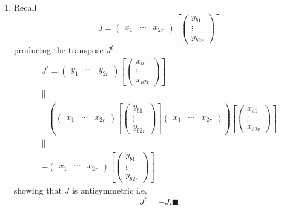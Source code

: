 \documentclass[aps,preprint]{revtex4}
\begin{document}
\begin{enumerate}
\item Recall 
\begin{equation}
J=\left( 
\begin{array}{ccc}
x_{1} & \cdots & x_{2r}%
\end{array}%
\right) \left[ \left( 
\begin{array}{c}
y_{b1} \\ 
\vdots \\ 
y_{b2r}%
\end{array}%
\right) \right]
\end{equation}%
producing the transpose $J^{t}$ 
\begin{gather}
J^{t}=\left( 
\begin{array}{ccc}
y_{1} & \cdots & y_{2r}%
\end{array}%
\right) \left[ \left( 
\begin{array}{c}
x_{b1} \\ 
\vdots \\ 
x_{b2r}%
\end{array}%
\right) \right] \\
\parallel \\
-\left( \overset{}{\left( 
\begin{array}{ccc}
x_{1} & \cdots & x_{2r}%
\end{array}%
\right) \left[ \left( 
\begin{array}{c}
y_{b1} \\ 
\vdots \\ 
y_{b2r}%
\end{array}%
\right) \right] \left( 
\begin{array}{ccc}
x_{1} & \cdots & x_{2r}%
\end{array}%
\right) }\right) \left[ \left( 
\begin{array}{c}
x_{b1} \\ 
\vdots \\ 
x_{b2r}%
\end{array}%
\right) \right] \\
\parallel \\
-\left( 
\begin{array}{ccc}
x_{1} & \cdots & x_{2r}%
\end{array}%
\right) \left[ \left( 
\begin{array}{c}
y_{b1} \\ 
\vdots \\ 
y_{b2r}%
\end{array}%
\right) \right]
\end{gather}%
showing that $J$ is antisymmetric i.e. 
\begin{equation}
J^{t}=-J.\blacksquare
\end{equation}
\end{enumerate}
\end{document}
